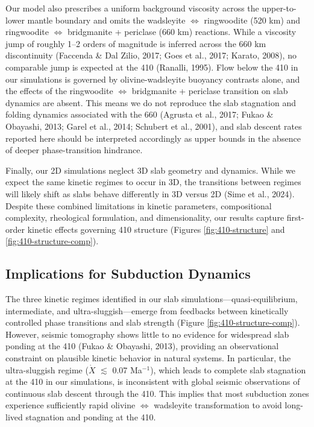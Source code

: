 \documentclass[draft,linenumbers]{agujournal2019}
\begin{document}
Our model also prescribes a uniform background viscosity across the
upper-to-lower mantle boundary and omits the wadsleyite
\(\Leftrightarrow\) ringwoodite (520 km) and ringwoodite
\(\Leftrightarrow\) bridgmanite + periclase (660 km) reactions. While a
viscosity jump of roughly 1--2 orders of magnitude is inferred across
the 660 km discontinuity (Faccenda \& Dal Zilio, 2017; Goes et al.,
2017; Karato, 2008), no comparable jump is expected at the 410 (Ranalli,
1995). Flow below the 410 in our simulations is governed by
olivine-wadsleyite buoyancy contrasts alone, and the effects of the
ringwoodite \(\Leftrightarrow\) bridgmanite + periclase transition on
slab dynamics are absent. This means we do not reproduce the slab
stagnation and folding dynamics associated with the 660 (Agrusta et al.,
2017; Fukao \& Obayashi, 2013; Garel et al., 2014; Schubert et al.,
2001), and slab descent rates reported here should be interpreted
accordingly as upper bounds in the absence of deeper phase-transition
hindrance.

Finally, our 2D simulations neglect 3D slab geometry and dynamics. While
we expect the same kinetic regimes to occur in 3D, the transitions
between regimes will likely shift as slabs behave differently in 3D
versus 2D (Sime et al., 2024). Despite these combined limitations in
kinetic parameters, compositional complexity, rheological formulation,
and dimensionality, our results capture first-order kinetic effects
governing 410 structure (Figures \ref{fig:410-structure} and
\ref{fig:410-structure-comp}).

\subsection{Implications for Subduction
Dynamics}\label{sec:implications-for-subduction-dynamics}

The three kinetic regimes identified in our slab
simulations---quasi-equilibrium, intermediate, and
ultra-sluggish---emerge from feedbacks between kinetically controlled
phase transitions and slab strength (Figure
\ref{fig:410-structure-comp}). However, seismic tomography shows little
to no evidence for widespread slab ponding at the 410 (Fukao \&
Obayashi, 2013), providing an observational constraint on plausible
kinetic behavior in natural systems. In particular, the ultra-sluggish
regime (\(\dot{X}\) \(\lesssim\) 0.07 Ma\(^{-1}\)), which leads to
complete slab stagnation at the 410 in our simulations, is inconsistent
with global seismic observations of continuous slab descent through the
410. This implies that most subduction zones experience sufficiently
rapid olivine \(\Leftrightarrow\) wadsleyite transformation to avoid
long-lived stagnation and ponding at the 410.
\end{document}
